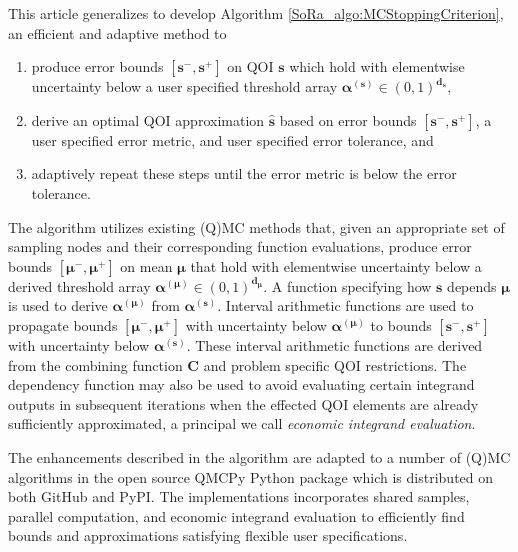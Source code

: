 \documentclass[graybox]{svmult}
\begin{document}
This article generalizes \cite{adaptive_qmc} to develop Algorithm \ref{SoRa_algo:MCStoppingCriterion}, an efficient and adaptive method to 
\begin{enumerate}
    \item produce error bounds $[\boldsymbol{s}^-,\boldsymbol{s}^+]$ on QOI $\boldsymbol{s}$ which hold with elementwise uncertainty below a user specified threshold array $\boldsymbol{\alpha}^{(\boldsymbol{s})} \in (0,1)^{\boldsymbol{d}_{\boldsymbol{s}}}$, 
    \item derive an optimal QOI approximation $\hat{\boldsymbol{s}}$ based on error bounds $[\boldsymbol{s}^-,\boldsymbol{s}^+]$, a user specified error metric, and user specified error tolerance, and
    \item adaptively repeat these steps until the error metric is below the error tolerance. 
\end{enumerate}
The algorithm utilizes existing (Q)MC methods that, given an appropriate set of sampling nodes and their corresponding function evaluations, produce error bounds $[\boldsymbol{\mu}^-,\boldsymbol{\mu}^+]$ on mean $\boldsymbol{\mu}$ that hold with elementwise uncertainty below a derived threshold array $\boldsymbol{\alpha}^{(\boldsymbol{\mu})} \in (0,1)^{\boldsymbol{d}_{\boldsymbol{\mu}}}$. A function specifying how $\boldsymbol{s}$ depends  $\boldsymbol{\mu}$ is used to derive $\boldsymbol{\alpha}^{(\boldsymbol{\mu})}$ from $\boldsymbol{\alpha}^{(\boldsymbol{s})}$. Interval arithmetic functions are used to propagate bounds $[\boldsymbol{\mu}^-,\boldsymbol{\mu}^+]$ with uncertainty below $\boldsymbol{\alpha}^{(\boldsymbol{\mu})}$ to bounds  $[\boldsymbol{s}^-,\boldsymbol{s}^+]$ with uncertainty below $\boldsymbol{\alpha}^{(\boldsymbol{s})}$. These interval arithmetic functions are derived from the combining function $\boldsymbol{C}$ and problem specific QOI restrictions. The dependency function may also be used to avoid evaluating certain integrand outputs in subsequent iterations when the effected QOI elements are already sufficiently approximated, a principal we call \emph{economic integrand evaluation}. 

The enhancements described in the algorithm are adapted to a number of (Q)MC algorithms in the open source QMCPy Python package \cite{QMCPy} which is distributed on both GitHub and PyPI. The implementations incorporates shared samples, parallel computation, and economic integrand evaluation to efficiently find bounds and approximations satisfying flexible user specifications.
\end{document}
